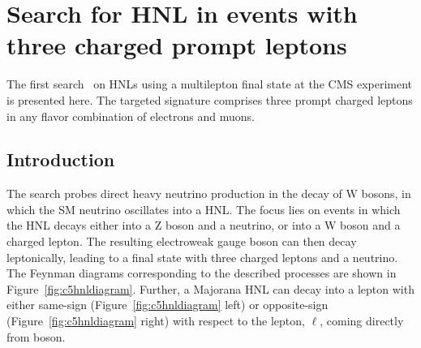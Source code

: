 \chapter{Search for HNL in events with three charged prompt
  leptons} \label{Chapter5}

The first search~\cite{Sirunyan:2018mtv} on HNLs using a multilepton
final state at the CMS
experiment is presented here. The targeted signature comprises 
three prompt charged leptons in any flavor combination of electrons
and muons. 

\section{Introduction}
The search probes direct heavy neutrino production in the decay of W
bosons, in which the SM neutrino oscillates into a HNL. The focus
lies on events in which the HNL decays either into a Z boson and a
neutrino, or into a W boson and a charged lepton. The resulting
electroweak gauge boson can then decay leptonically, leading to a
final state with three charged leptons and a neutrino. The Feynman diagrams corresponding to the described processes are shown in 
Figure~\ref{fig:c5hnldiagram}. Further, a Majorana HNL can decay into a lepton with either same-sign (Figure~\ref{fig:c5hnldiagram} left) 
or opposite-sign (Figure~\ref{fig:c5hnldiagram} right) with respect to the lepton, $\ell$, coming directly from \PW boson. 
